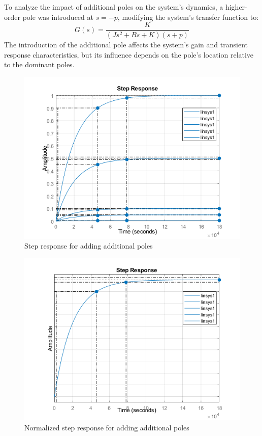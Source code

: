 \documentclass[a4paper, 12pt, english]{article}
\begin{document}
\noindent
To analyze the impact of additional poles on the system's dynamics, a higher-order pole was introduced at $ {s} = {-p} $, modifying the system's transfer function to:
\[ {G\left({s}\right)} = \frac{K}{{\left( {J}{{s}^{2}} + {B}{s} + {K} \right)} {\left( {s} + {p} \right)}} \]
The introduction of the additional pole affects the system's gain and transient response characteristics, but its influence depends on the pole's location relative to the dominant poles.
\begin{figure}[H]
    \centering
    \includegraphics[width=0.82\linewidth]{report/images/poles_step_response.png}
    \caption{Step response for adding additional poles}
    \label{fig:Step response for additional poles}
\end{figure}

\begin{figure}[H]
    \centering
    \includegraphics[width=0.82\linewidth]{report/images/poles_step_response_normalized.png}
    \caption{Normalized step response for adding additional poles}
    \label{fig:normalized step response for additional poles}
\end{figure}
\end{document}
